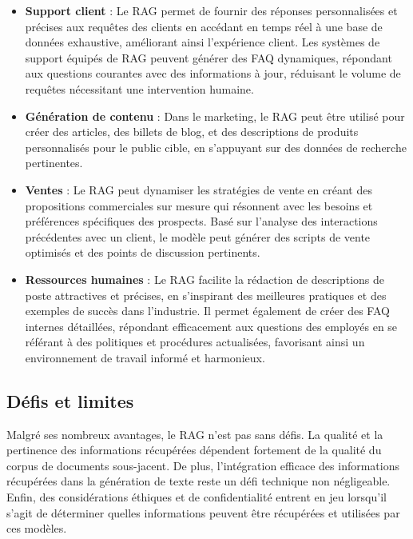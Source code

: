 \begin{itemize}[leftmargin=1.5cm]
	\item \textbf{Support client} : Le RAG permet de fournir des réponses
		personnalisées et précises aux requêtes des clients en accédant en temps
		réel à une base de données exhaustive, améliorant ainsi l’expérience client.
		Les systèmes de support équipés de RAG peuvent générer des FAQ dynamiques, répondant
		aux questions courantes avec des informations à jour, réduisant le volume de
		requêtes nécessitant une intervention humaine.

	\item \textbf{Génération de contenu} : Dans le marketing, le RAG peut être utilisé
		pour créer des articles, des billets de blog, et des descriptions de produits
		personnalisés pour le public cible, en s’appuyant sur des données de
		recherche pertinentes.

	\item \textbf{Ventes} : Le RAG peut dynamiser les stratégies de vente en
		créant des propositions commerciales sur mesure qui résonnent avec les
		besoins et préférences spécifiques des prospects. Basé sur l’analyse des interactions
		précédentes avec un client, le modèle peut générer des scripts de vente
		optimisés et des points de discussion pertinents.

	\item \textbf{Ressources humaines} : Le RAG facilite la rédaction de
		descriptions de poste attractives et précises, en s’inspirant des meilleures
		pratiques et des exemples de succès dans l’industrie. Il permet également de
		créer des FAQ internes détaillées, répondant efficacement aux questions des employés
		en se référant à des politiques et procédures actualisées, favorisant ainsi
		un environnement de travail informé et harmonieux.
\end{itemize}

\subsection*{Défis et limites}

Malgré ses nombreux avantages, le RAG n’est pas sans défis. La qualité et la pertinence
des informations récupérées dépendent fortement de la qualité du corpus de documents
sous-jacent. De plus, l’intégration efficace des informations récupérées dans la
génération de texte reste un défi technique non négligeable. Enfin, des considérations
éthiques et de confidentialité entrent en jeu lorsqu’il s’agit de déterminer quelles
informations peuvent être récupérées et utilisées par ces modèles.

